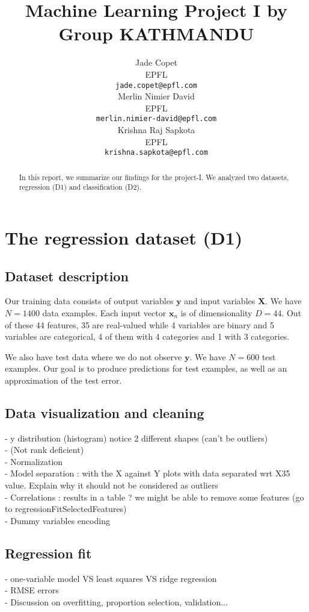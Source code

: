 \documentclass{article} %
\title{Machine Learning Project I by Group KATHMANDU}
\author{
Jade Copet\\
EPFL \\
\texttt{jade.copet@epfl.com} \\
\And
Merlin Nimier David\\
EPFL \\
\texttt{merlin.nimier-david@epfl.com} \\
\And
Krishna Raj Sapkota\\
EPFL \\
\texttt{krishna.sapkota@epfl.com} \\
}
\begin{document}
\maketitle



\begin{abstract}
  In this report, we summarize our findings for the project-I. We analyzed two datasets, regression (D1) and classification (D2).
\end{abstract}



\section{The regression dataset (D1)}

  \subsection{Dataset description}
    Our training data consists of output variables $\mathbf{y}$ and input variables $\mathbf{X}$. We have $N = 1400$ data examples. Each input vector $\mathbf{x}_n$ is of dimensionality $D = 44$. Out of these 44 features, 35 are real-valued while 4 variables are binary and 5 variables are categorical, 4 of them with 4 categories and 1 with 3 categories.

    We also have test data where we do not observe $\mathbf{y}$. We have $N = 600$ test examples. Our goal is to produce predictions for test examples, as well as an approximation of the test error.

  \subsection{Data visualization and cleaning}
    - y distribution (histogram) notice 2 different shapes (can't be outliers)\\
    - (Not rank deficient)\\
    - Normalization\\
    - Model separation : with the X against Y plots with data separated wrt X35 value. Explain why it should not be considered as outliers \\
    - Correlations : results in a table ? we might be able to remove some features (go to regressionFitSelectedFeatures)\\
    - Dummy variables encoding

  \subsection{Regression fit}
    - one-variable model VS least squares VS ridge regression\\
    - RMSE errors\\
    - Discussion on overfitting, proportion selection, validation...
\end{document}
